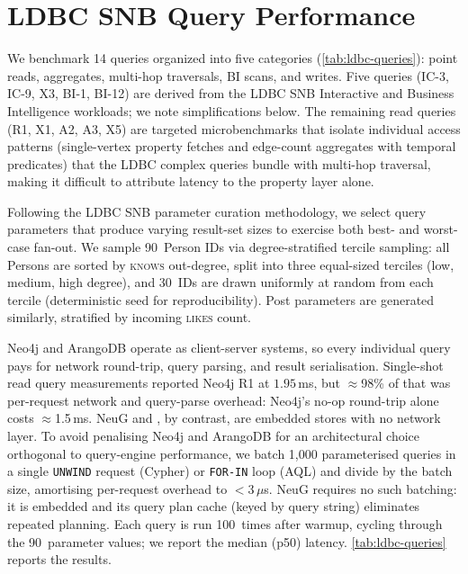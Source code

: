 \section{LDBC SNB Query Performance}
\label{sec:eval:property-ldbc}

We benchmark 14 queries organized into five categories
(\autoref{tab:ldbc-queries}): point reads, aggregates, multi-hop traversals,
BI scans, and writes.
Five queries (IC-3, IC-9, X3, BI-1, BI-12) are derived from the LDBC SNB
Interactive and Business Intelligence workloads; we note simplifications below.
The remaining read queries (R1, X1, A2, A3, X5) are targeted microbenchmarks
that isolate individual access patterns (single-vertex property fetches and
edge-count aggregates with temporal predicates) that the LDBC complex queries
bundle with multi-hop traversal, making it difficult to attribute latency to
the property layer alone.

Following the LDBC SNB parameter curation methodology, we select query
parameters that produce varying result-set sizes to exercise both best- and
worst-case fan-out.
We sample 90~Person IDs via degree-stratified tercile sampling: all Persons are
sorted by \textsc{knows} out-degree, split into three equal-sized terciles
(low, medium, high degree), and 30~IDs are drawn uniformly at random from each
tercile (deterministic seed for reproducibility).
Post parameters are generated similarly, stratified by incoming
\textsc{likes} count.

Neo4j and ArangoDB operate as client-server systems, so every individual query pays for network round-trip, query parsing, and result serialisation.
Single-shot read query measurements reported Neo4j R1 at $1.95$\,ms, but $\approx$98\% of that was per-request network and query-parse overhead: Neo4j's no-op round-trip alone costs $\approx$1.5\,ms.
NeuG and \project{}, by contrast, are embedded stores with no network layer.
To avoid penalising Neo4j and ArangoDB for an architectural choice orthogonal to query-engine performance, we batch 1,000 parameterised queries in a single \texttt{UNWIND} request (Cypher) or \texttt{FOR-IN} loop (AQL) and divide by the batch size, amortising per-request overhead to $<$3\,$\mu$s.
NeuG requires no such batching: it is embedded and its query plan cache (keyed by query string) eliminates repeated planning.
Each query is run 100~times after warmup, cycling through the 90~parameter
values; we report the median (p50) latency.
\autoref{tab:ldbc-queries} reports the results.

